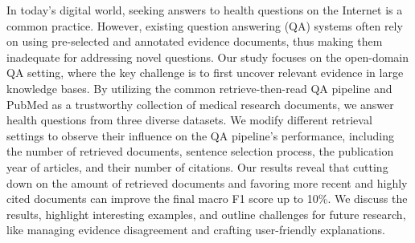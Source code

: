 In today's digital world, seeking answers to health questions on the Internet is a common practice. However, existing question answering (QA) systems often rely on using pre-selected and annotated evidence documents, thus making them inadequate for addressing novel questions. Our study focuses on the open-domain QA setting, where the key challenge is to first uncover relevant evidence in large knowledge bases. By utilizing the common retrieve-then-read QA pipeline and PubMed as a trustworthy collection of medical research documents, we answer health questions from three diverse datasets. We modify different retrieval settings to observe their influence on the QA pipeline's performance, including the number of retrieved documents, sentence selection process, the publication year of articles, and their number of citations. Our results reveal that cutting down on the amount of retrieved documents and favoring more recent and highly cited documents can improve the final macro F1 score up to 10\%. We discuss the results, highlight interesting examples, and outline challenges for future research, like managing evidence disagreement and crafting user-friendly explanations.